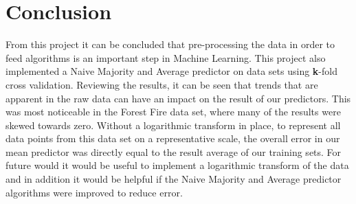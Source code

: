 \documentclass[twoside,11pt]{article}
\begin{document}
\newpage

\section{Conclusion}
From this project it can be concluded that pre-processing the data in order to feed algorithms is an important step in Machine Learning. This project also implemented a Naive Majority and Average predictor on data sets using \textbf{k}-fold cross validation. Reviewing the results, it can be seen that trends that are apparent in the raw data can have an impact on the result of our predictors. This was most noticeable in the Forest Fire data set, where many of the results were skewed towards zero. Without a logarithmic transform in place, to represent all data points from this data set on a representative scale, the overall error in our mean predictor was directly equal to the result average of our training sets. For future would it would be useful to implement a logarithmic transform of the data and in addition it would be helpful if the Naive Majority and Average predictor algorithms were improved to reduce error. 

\newpage



\vskip 0.2in

\end{document}
